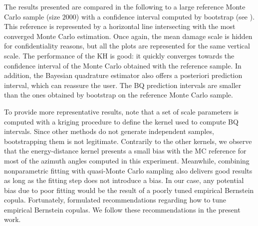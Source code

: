 The results presented are compared in the following to a large reference Monte Carlo sample (size $2000$) with a confidence interval computed by bootstrap (see ). 
This reference is represented by a horizontal line intersecting with the most converged Monte Carlo estimation.
Once again, the mean damage scale is hidden for confidentiality reasons, but all the plots are represented for the same vertical scale. 
The performance of the KH is good: it quickly converges towards the confidence interval of the Monte Carlo obtained with the reference sample. 
In addition, the Bayesian quadrature estimator also offers a posteriori prediction interval, which can reassure the user. 
The BQ prediction intervals are smaller than the ones obtained by bootstrap on the reference Monte Carlo sample. 

To provide more representative results, note that a set of scale parameters is computed with a kriging procedure to define the kernel used to compute BQ intervals. 
Since other methods do not generate independent samples, bootstrapping them is not legitimate. 
Contrarily to the other kernels, we observe that the energy-distance kernel presents a small bias with the MC reference for most of the azimuth angles computed in this experiment. 
Meanwhile, combining nonparametric fitting with quasi-Monte Carlo sampling also delivers good results as long as the fitting step does not introduce a bias. 
In our case, any potential bias due to poor fitting would be the result of a poorly tuned empirical Bernstein copula. 
Fortunately, \cite{nagler_2017} formulated recommendations regarding how to tune empirical Bernstein copulas. 
We follow these recommendations in the present work.



